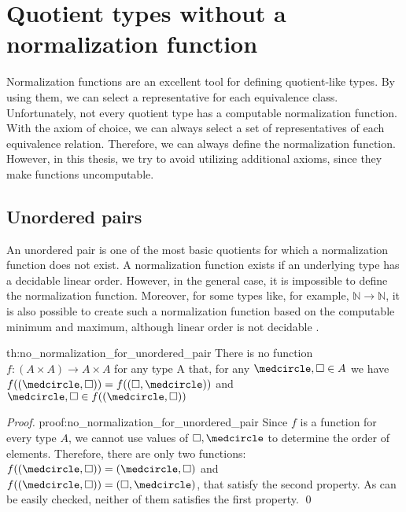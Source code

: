 \section{Quotient types without a normalization function}
Normalization functions are an excellent tool for defining quotient-like types. By using them, we can select a representative for each equivalence class. Unfortunately, not every quotient type has a computable normalization function. With the axiom of choice, we can always select a set of representatives of each equivalence relation. Therefore, we can always define the normalization function. However, in this thesis, we try to avoid utilizing additional axioms, since they make functions uncomputable.

\subsection{Unordered pairs}
An unordered pair is one of the most basic quotients for which a normalization function does not exist. A normalization function exists if an underlying type has a decidable linear order. However, in the general case, it is impossible to define the normalization function. Moreover, for some types like, for example, $\mathbb{N} \rightarrow \mathbb{N}$, it is also possible to create such a normalization function based on the computable minimum and maximum, although linear order is not decidable \cite{DefinableQuotients}.
\pagebreak
\begin{theo}{}{th:no_normalization_for_unordered_pair}
There is no function $f: (A \times A) \rightarrow A \times A$ for any type A that, for any $\medcircle , \square \in A$ we have $f((\medcircle , \square)) = f((\square, \medcircle))$ and $\medcircle , \square \in f((\medcircle , \square))$ 
\end{theo}

\begin{proof}{}{proof:no_normalization_for_unordered_pair}
Since $f$ is a function for every type $A$, we cannot use values of $\square, \medcircle$ to determine the order of elements. Therefore, there are only two functions: $f((\medcircle , \square)) = (\medcircle , \square)$ and $f((\medcircle , \square)) = (\square , \medcircle)$, that satisfy the second property. As can be easily checked, neither of them satisfies the first property. \qed
\end{proof}

